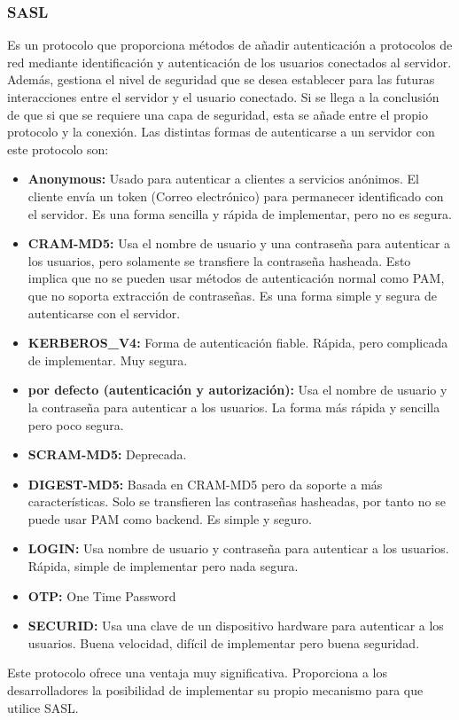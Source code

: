 \documentclass[titlepage, 12pt, a4paper]{article}
\begin{document}
\subsubsection{\Gls{SASL}}
Es un protocolo que proporciona métodos de añadir autenticación a protocolos de red mediante identificación y autenticación de los usuarios conectados al servidor. Además, gestiona el nivel de seguridad que se desea establecer para las futuras interacciones entre el servidor y el usuario conectado. Si se llega a la conclusión de que si que se requiere una capa de seguridad, esta se añade entre el propio protocolo y la conexión.\cite{rfc2222} 
Las distintas formas de autenticarse a un servidor con este protocolo son:
\begin{itemize}
	\item{\textbf{Anonymous: }}Usado para autenticar a clientes a servicios anónimos. El cliente envía un token (Correo electrónico) para permanecer identificado con el servidor. Es una forma sencilla y rápida de implementar, pero no es segura.
	\item{\textbf{CRAM-MD5: }}Usa el nombre de usuario y una contraseña para autenticar a los usuarios, pero solamente se transfiere la contraseña hasheada. Esto implica que no se pueden usar métodos de autenticación normal como \Gls{PAM}, que no soporta extracción de contraseñas. Es una forma simple y segura de autenticarse con el servidor.
	\item{\textbf{KERBEROS\_V4: }}Forma de autenticación fiable. Rápida, pero complicada de implementar. Muy segura.
	\item{\textbf{por defecto (autenticación y autorización): }}Usa el nombre de usuario y la contraseña para autenticar a los usuarios. La forma más rápida y sencilla pero poco segura.
	\item{\textbf{SCRAM-MD5: }}Deprecada.
	\item{\textbf{DIGEST-MD5: }}Basada en CRAM-MD5 pero da soporte a más características. Solo se transfieren las contraseñas hasheadas, por tanto no se puede usar \Gls{PAM} como backend. Es simple y seguro.
	\item{\textbf{LOGIN: }}Usa nombre de usuario y contraseña para autenticar a los usuarios. Rápida, simple de implementar pero nada segura.
	\item{\textbf{OTP: }}One Time Password
	\item{\textbf{SECURID: }}Usa una clave de un dispositivo hardware para autenticar a los usuarios. Buena velocidad, difícil de implementar pero buena seguridad.
\end{itemize}
Este protocolo ofrece una ventaja muy significativa. Proporciona a los desarrolladores la posibilidad de implementar su propio mecanismo para que utilice SASL.
\end{document}
